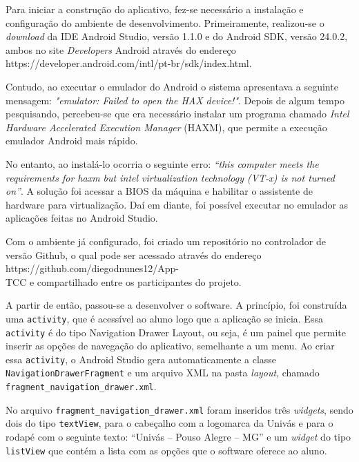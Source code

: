 
	\par Para iniciar a construção do aplicativo, fez-se necessário a instalação e
configuração do ambiente de desenvolvimento. Primeiramente, realizou-se o
\textit{download} da IDE Android Studio, versão 1.1.0 e do Android SDK, versão
24.0.2, ambos no site \textit{Developers} Android através do endereço
https://developer.android.com/intl/pt-br/sdk/index.html.

	\par Contudo, ao executar o emulador do Android o sistema apresentava a
seguinte mensagem: \textit{"emulator: Failed to open the HAX device!"}.
Depois de algum tempo pesquisando, percebeu-se que era necessário instalar um programa
chamado \textit{Intel Hardware Accelerated Execution Manager} (HAXM), que
permite a execução emulador Android mais rápido.

	\par No entanto, ao instalá-lo ocorria o seguinte erro:\textit{ “this computer
meets the requirements for haxm but intel virtualization technology (VT-x) is
not turned on”}.  A solução foi acessar a BIOS da máquina e habilitar o
assistente de hardware para virtualização. Daí em diante, foi possível executar
no emulador as aplicações feitas no Android Studio.

	\par Com o ambiente já configurado, foi criado um repositório no controlador de
versão Github, o qual pode ser acessado através do endereço
https://github.com/diegodnunes12/App-\\TCC e compartilhado entre os
participantes do projeto.

	\par A partir de então, passou-se a desenvolver o software. A princípio, foi
construída uma \texttt{activity}, que é acessível ao aluno logo que a aplicação
se inicia. Essa \texttt{activity} é do tipo Navigation Drawer Layout, ou seja,
é um painel que permite inserir as opções de navegação do aplicativo,
semelhante a um menu.  Ao criar essa \texttt{activity}, o Android Studio gera
automaticamente a classe \texttt{NavigationDrawerFragment} e um arquivo XML na
pasta \textit{layout}, chamado \texttt{fragment\_navigation\_drawer.xml}.

	\par No arquivo \texttt{fragment\_navigation\_drawer.xml} foram inseridos três
\textit{widgets}, sendo dois do tipo \texttt{textView}, para o cabeçalho com a
logomarca da Univás e para o rodapé com o seguinte texto: “Univás – Pouso
Alegre – MG” e um \textit{widget} do tipo \texttt{listView} que contém a lista
com as opções que o software oferece ao aluno.

